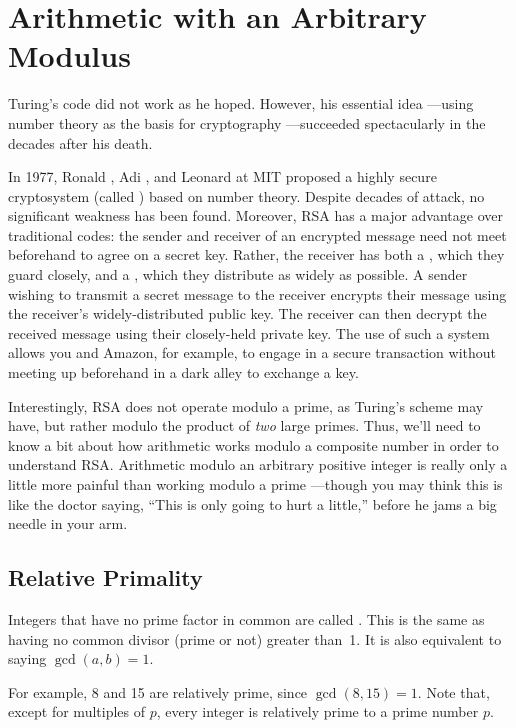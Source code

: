 \section{Arithmetic with an Arbitrary Modulus}\label{arithmetic_modn_sec}

Turing's code did not work as he hoped.  However, his essential idea ---using number theory
as the basis for cryptography ---succeeded spectacularly in the decades after his death.

In 1977, Ronald , Adi , and Leonard  at MIT proposed a
highly secure cryptosystem (called \textbf{}) based on number theory.  Despite
decades of attack, no significant weakness has been found.  Moreover, RSA has a major
advantage over traditional codes: the sender and receiver of an encrypted message need not
meet beforehand to agree on a secret key.  Rather, the receiver has both a , which they guard closely, and a , which they distribute as widely
as possible.  A sender wishing to transmit a secret message to the receiver encrypts their
message using the receiver's widely-distributed public key.  The receiver can then decrypt
the received message using their closely-held private key.  The use of such a  system allows you and Amazon, for example, to engage in a secure
transaction without meeting up beforehand in a dark alley to exchange a key.

Interestingly, RSA does not operate modulo a prime, as Turing's scheme may have, but rather
modulo the product of \emph{two} large primes.  Thus, we'll need to know a bit about how
arithmetic works modulo a composite number in order to understand RSA.  Arithmetic modulo
an arbitrary positive integer is really only a little more painful than working modulo a
prime ---though you may think this is like the doctor saying, ``This is only going to hurt
a little,'' before he jams a big needle in your arm.

\subsection{Relative Primality}

Integers that have no prime factor in common are called .  This is
the same as having no common divisor (prime or not) greater than~1.  It is also equivalent
to saying $\gcd(a, b) = 1$.

For example, 8 and 15 are relatively prime, since $\gcd(8, 15) = 1$.  Note that, except for
multiples of $p$, every integer is relatively prime to a prime number $p$.

